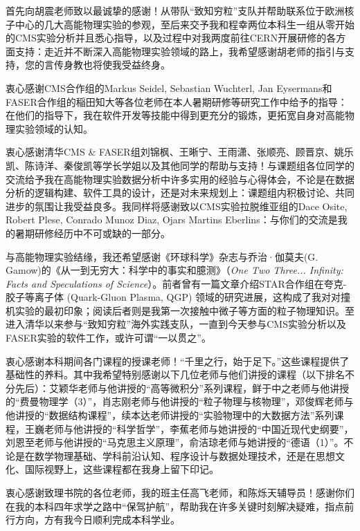 
\begin{acknowledgements}

首先向胡震老师致以最诚挚的感谢！从带队“致知穷粒”支队并帮助联系位于欧洲核子中心的几大高能物理实验的参观，至后来交予我和程幸两位本科生一组从零开始的CMS实验分析并且悉心指导，以及过程中对我两度前往CERN开展研修的各方面支持：走近并不断深入高能物理实验领域的路上，我希望感谢胡老师的指引与支持，您的言传身教也将使我受益终身。

衷心感谢CMS合作组的Markus Seidel, Sebastian Wuchterl, Jan Eysermans和FASER合作组的稲田知大等各位老师在本人暑期研修等研究工作中给予的指导：在他们的指导下，我在软件开发等技能中得到更充分的锻炼，更拓宽自身对高能物理实验领域的认知。

衷心感谢清华CMS \& FASER组刘锦枫、王晰宁、王雨潇、张顺亮、顾晋京、姚乐凯、陈诗洋、秦俊凯等学长学姐以及其他同学的帮助与支持！与课题组各位同学的交流给予我在高能物理实验数据分析中许多实用的经验与心得体会，不论是在数据分析的逻辑构建、软件工具的设计，还是对未来规划上：课题组内积极讨论、共同进步的氛围让我受益良多。我同样将感谢致以CMS实验拉脱维亚组的Dace Osite, Robert Plese, Conrado Munoz Diaz, Ojars Martins Eberlins：与你们的交流是我的暑期研修经历中不可或缺的一部分。

与高能物理实验结缘，我还希望感谢《环球科学》杂志与乔治·伽莫夫(G. Gamow)的《从一到无穷大：科学中的事实和臆测》（\textit{One Two Three... Infinity: Facts and Speculations of Science}）。前者曾有一篇文章介绍STAR合作组在夸克-胶子等离子体 (Quark-Gluon Plasma, QGP) 领域的研究进展，这构成了我对对撞机实验的最初印象；阅读后者则是我第一次接触中微子等方面的粒子物理知识。至进入清华以来参与“致知穷粒”海外实践支队，一直到今天参与CMS实验分析以及FASER实验的软件工作，或许可谓“一以贯之”。

衷心感谢本科期间各门课程的授课老师！“千里之行，始于足下。”这些课程提供了基础性的养料。其中我希望特别感谢以下几位老师与他们讲授的课程（以下排名不分先后）：艾颖华老师与他讲授的“高等微积分”系列课程，鲜于中之老师与他讲授的“费曼物理学（3）”，肖志刚老师与他讲授的“粒子物理与核物理”，邓俊辉老师与他讲授的“数据结构课程”，续本达老师讲授的“实验物理中的大数据方法”系列课程，王巍老师与他讲授的“科学哲学”，李蕉老师与她讲授的“中国近现代史纲要”，刘恩至老师与他讲授的“马克思主义原理”，俞洁琼老师与她讲授的“德语（1）”。不论是在数学物理基础、学科前沿认知、程序设计与数据处理技术，还是在思想文化、国际视野上，这些课程都在我身上留下印记。

衷心感谢致理书院的各位老师，我的班主任高飞老师，和陈烁天辅导员！感谢你们在我的本科四年求学之路中“保驾护航”，帮助我在许多关键时刻解决疑难，指点前行方向，方有我今日顺利完成本科学业。


\end{acknowledgements}
